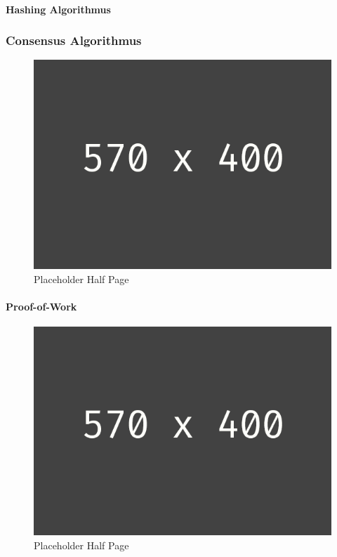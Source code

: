 \paragraph{Hashing Algorithmus}


\subsubsection{Consensus Algorithmus}
\begin{figure}[h!]
	\centering
	\includegraphics[width=1.0\linewidth]{pictures/placeholder_half_page}
	\caption[Placeholder Half Page]{Placeholder Half Page}
	\label{fig:placeholder_half_page}
\end{figure}


\paragraph{Proof-of-Work}
\begin{figure}[h!]
	\centering
	\includegraphics[width=1.0\linewidth]{pictures/placeholder_half_page}
	\caption[Placeholder Half Page]{Placeholder Half Page}
	\label{fig:placeholder_half_page}
\end{figure}


